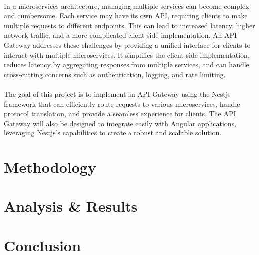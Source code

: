 \documentclass{article}
\begin{document}
\paragraph{}
In a microservices architecture, managing multiple services can become complex and cumbersome. Each service may have its own API, requiring clients to make multiple requests to different endpoints. This can lead to increased latency, higher network traffic, and a more complicated client-side implementation.
An API Gateway addresses these challenges by providing a unified interface for clients to interact with multiple microservices. It simplifies the client-side implementation, reduces latency by aggregating responses from multiple services, and can handle cross-cutting concerns such as authentication, logging, and rate limiting.

\paragraph{}
The goal of this project is to implement an API Gateway using the Nestjs framework that can efficiently route requests to various microservices, handle protocol translation, and provide a seamless experience for clients. The API Gateway will also be designed to integrate easily with Angular applications, leveraging Nestjs's capabilities to create a robust and scalable solution.

\section{Methodology}
\paragraph{}


\section{Analysis \& Results}
\paragraph{}


\section{Conclusion}
\end{document}
